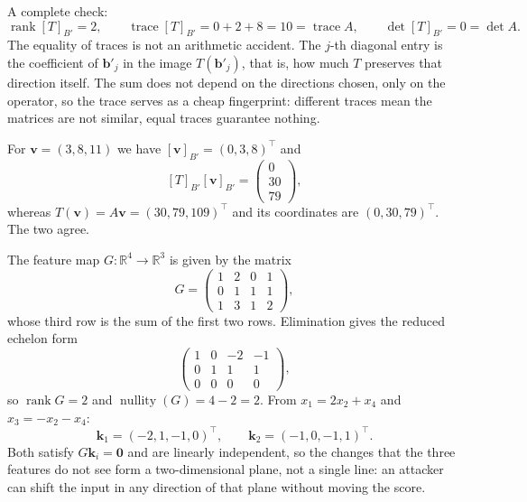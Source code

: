 A complete check:
\[
  \operatorname{rank}[T]_{B'}=2,\qquad \operatorname{trace}[T]_{B'}=0+2+8=10=\operatorname{trace}A,
  \qquad \det[T]_{B'}=0=\det A .
\]
The equality of traces is not an arithmetic accident. The $j$-th diagonal entry is the coefficient of
$\mathbf{b}'_{j}$ in the image $T(\mathbf{b}'_{j})$, that is, how much $T$
preserves
that direction itself. The sum does not depend on the directions chosen, only on the operator,
so the trace serves as a cheap fingerprint: different traces mean the matrices are not similar, equal
traces
guarantee nothing.

For $\mathbf{v}=(3,8,11)$ we have $[\mathbf{v}]_{B'}=(0,3,8)^{\top}$ and
\[
  [T]_{B'}[\mathbf{v}]_{B'}=\begin{pmatrix}0\\30\\79\end{pmatrix},
\]
whereas $T(\mathbf{v})=A\mathbf{v}=(30,79,109)^{\top}$ and its coordinates are
$(0,30,79)^{\top}$. The two agree.

The feature map $G\colon\mathbb{R}^{4}\to\mathbb{R}^{3}$
is given by the matrix
\[
  G=\begin{pmatrix}1&2&0&1\\ 0&1&1&1\\ 1&3&1&2\end{pmatrix},
\]
whose third row is the sum of the first two rows. Elimination gives the reduced echelon
form
\[
  \begin{pmatrix}1&0&-2&-1\\ 0&1&1&1\\ 0&0&0&0\end{pmatrix},
\]
so $\operatorname{rank}G=2$ and $\operatorname{nullity}(G)=4-2=2$. From
$x_{1}=2x_{2}+x_{4}$ and $x_{3}=-x_{2}-x_{4}$:
\[
  \mathbf{k}_{1}=(-2,1,-1,0)^{\top},\qquad \mathbf{k}_{2}=(-1,0,-1,1)^{\top}.
\]
Both satisfy $G\mathbf{k}_{i}=\mathbf{0}$ and are linearly independent, so the changes that the
three features do not see form a two-dimensional plane, not a single line: an attacker can
shift the input in any direction of that plane without moving the score.


